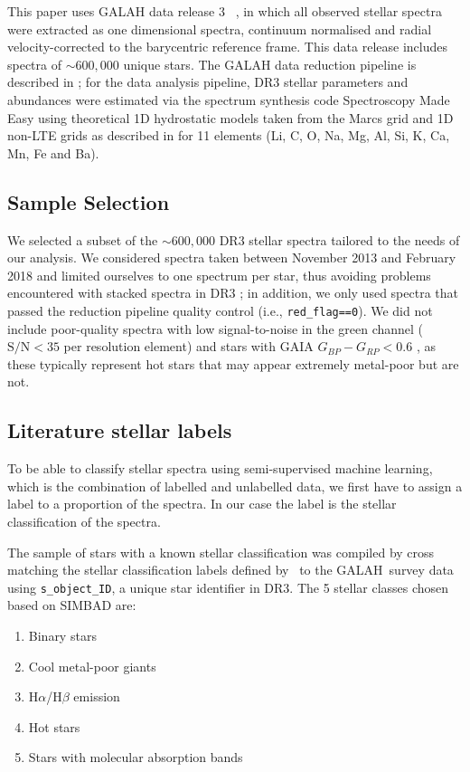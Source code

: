 \documentclass[]{aastex631}
\newcommand{\g}{GALAH\xspace}
\begin{document}
This paper uses GALAH data release 3
~\citep[DR3; ][]{2021MNRAS.506..150B}, in which all observed stellar spectra were extracted as one dimensional spectra, continuum normalised and radial velocity-corrected to the barycentric reference frame. This data release includes spectra of $\sim600,000$ unique stars. The GALAH data reduction pipeline is described in \citet{kos_2017}; for the data analysis pipeline, DR3 stellar parameters and abundances were estimated via the spectrum synthesis code Spectroscopy Made Easy \citep[SME; ][]{Valenti1996,Piskunov2017} using theoretical 1D hydrostatic models taken from the Marcs grid and 1D non-LTE grids as described in \cite{amarsi_2020} for 11 elements (Li, C, O, Na, Mg, Al, Si, K, Ca, Mn, Fe and Ba).




\subsection{Sample Selection}\label{sec:sample selection}
We selected a subset of the $\sim600,000$ DR3 stellar spectra tailored to the needs of our analysis. 
 We considered spectra taken between November 2013 and February 2018 and limited ourselves to one spectrum per star, thus avoiding problems encountered with stacked spectra in DR3 \citep[Sec 6.2 in~][]{2021MNRAS.506..150B}; in addition, we only used spectra that passed the reduction pipeline quality control (i.e., {\tt red\_flag==0}). 
We did not include poor-quality spectra with low signal-to-noise in the green channel ($\mathrm{S/N} < 35$  per resolution element) and stars with GAIA {$G_{BP} - G_{RP}$}$< 0.6$ \citep{gaia_dr2}, as these typically represent hot stars that may appear extremely metal-poor but are not.  



\subsection{Literature stellar labels}\label{sec:stellar labels}
To be able to classify stellar spectra using semi-supervised machine learning, which is the combination of labelled and unlabelled data, we first have to assign a label to a proportion of the spectra. In our case the label is the stellar classification of the spectra. 

The sample of stars with a known stellar classification was compiled by cross matching the stellar classification labels defined by~\cite{traven_galah_2017}  to the \g \ survey data using {\tt s\_object\_ID}, a unique star identifier in DR3.
The 5 stellar classes chosen based on SIMBAD are:
\begin{enumerate}
    \item Binary stars
    \item Cool metal-poor giants
    \item H$\alpha$/H$\beta$ emission
    \item Hot stars
    \item Stars with molecular absorption bands
\end{enumerate}
\end{document}
